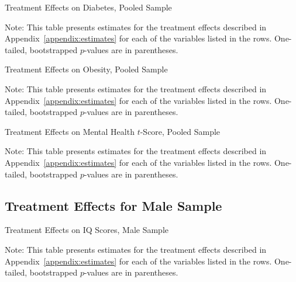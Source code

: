 	\begin{table}[H]
     \caption{Treatment Effects on Diabetes, Pooled Sample}
     \label{table:abccare_rslt_pooled_cat13}
	
	\end{table} 
\begin{spacing}{1}
\begin{footnotesize}
\noindent Note: This table presents estimates for the treatment effects described in Appendix~\ref{appendix:estimates} for each of the variables listed in the rows.  One-tailed, bootstrapped $p$-values are in parentheses.
\end{footnotesize}
\end{spacing}

	\begin{table}[H]
     \caption{Treatment Effects on Obesity, Pooled Sample}
     \label{table:abccare_rslt_pooled_cat14}
	
	\end{table} 
\begin{spacing}{1}
\begin{footnotesize}
\noindent Note: This table presents estimates for the treatment effects described in Appendix~\ref{appendix:estimates} for each of the variables listed in the rows.  One-tailed, bootstrapped $p$-values are in parentheses.
\end{footnotesize}
\end{spacing}

	\begin{table}[H]
     \caption{Treatment Effects on Mental Health $t$-Score, Pooled Sample}
     \label{table:abccare_rslt_pooled_cat15}
	
	\end{table} 
\begin{spacing}{1}
\begin{footnotesize}
\noindent Note: This table presents estimates for the treatment effects described in Appendix~\ref{appendix:estimates} for each of the variables listed in the rows.  One-tailed, bootstrapped $p$-values are in parentheses.
\end{footnotesize}
\end{spacing}


\subsection{Treatment Effects for Male Sample}


	\begin{table}[H]
     \caption{Treatment Effects on IQ Scores, Male Sample}
     \label{table:abccare_rslt_male_cat0}
	
	\end{table}
\begin{spacing}{1}
\begin{footnotesize}
\noindent Note: This table presents estimates for the treatment effects described in Appendix~\ref{appendix:estimates} for each of the variables listed in the rows.  One-tailed, bootstrapped $p$-values are in parentheses.
\end{footnotesize}
\end{spacing}


